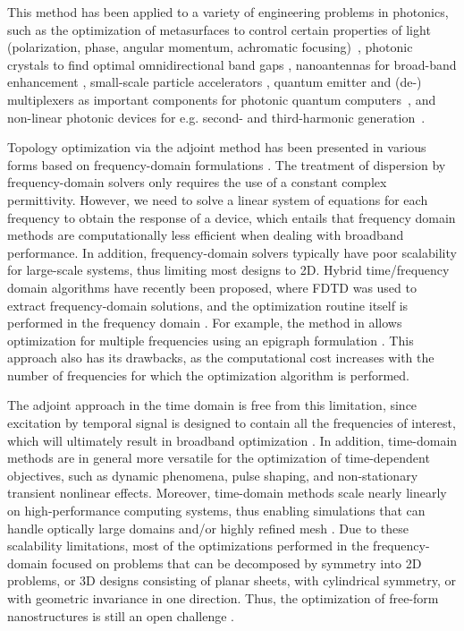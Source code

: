 \documentclass[aps,prl,twocolumn,superscriptaddress,longbibliography]{revtex4-1}
\begin{document}
This method has been applied to a variety of engineering problems in photonics, such as the optimization of metasurfaces to control certain properties of light (polarization, phase, angular momentum, achromatic focusing)~\cite{MetasurfacesReview, VortexBeams, Metalens1}, photonic crystals to find optimal omnidirectional band gaps \cite{PhotonicCrystal}, nanoantennas for broad-band enhancement \cite{Hassan:22}, small-scale particle accelerators \cite{LaserDriven}, quantum emitter and (de-) multiplexers as important components for photonic quantum computers~\cite{QE1, Beamsplitter, Demultiplexer, Multiplexer}, and non-linear photonic devices for e.g. second- and third-harmonic generation~\cite{NL2, NL1}.\par 
Topology optimization via the adjoint method has been presented in various forms based on frequency-domain formulations \cite{BookAdjoint, NonLinearTopOpt, PlasmonicTopOpt}. The treatment of dispersion by frequency-domain solvers only requires the use of a constant complex permittivity. However, we need to solve a linear system of equations for each frequency to obtain the response of a device, which entails that frequency domain methods are computationally less efficient when dealing with broadband performance. In addition, frequency-domain solvers typically have poor scalability for large-scale systems, thus limiting most designs to 2D. Hybrid time/frequency domain algorithms have recently been proposed, where FDTD was used to extract frequency-domain solutions, and the optimization routine itself is performed in the frequency domain \cite{meep, FDTDTopOpt}. For example, the method in \cite{meep} allows optimization for multiple frequencies using an epigraph formulation \cite{epigraf1, epigraf2}. This approach also has its drawbacks, as the computational cost increases with the number of frequencies for which the optimization algorithm is performed. 

The adjoint approach in the time domain is free from this limitation, since excitation by temporal signal is designed to contain all the frequencies of interest, which will ultimately result in broadband optimization \cite{Nomura07,Hassan2018,Hassan:22}. 
In addition, time-domain methods are in general more versatile for the optimization of time-dependent objectives, such as dynamic phenomena, pulse shaping, and non-stationary transient nonlinear effects. Moreover, time-domain methods scale nearly linearly on high-performance computing systems, thus enabling simulations that can handle optically large domains and/or highly refined mesh \cite{convergence}. Due to these scalability limitations, most of the optimizations performed in the frequency-domain focused on problems that can be decomposed by symmetry into 2D problems, or 3D designs consisting of planar sheets, with cylindrical symmetry, or with geometric invariance in one direction. Thus, the optimization of free-form nanostructures is still an open challenge \cite{Metasurfaces}.
\end{document}

